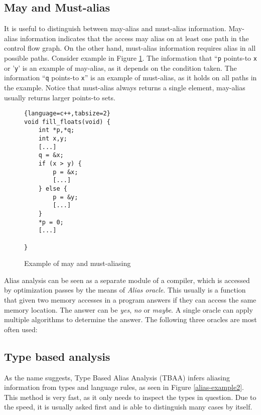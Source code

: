 \subsection{May and Must-alias}

It is useful to distinguish between may-alias and must-alias information.
May-alias information indicates that the access may alias on at least one path
in the control flow graph. On the other hand, must-alias information requires
alias in all possible paths. Consider example in Figure
\ref{alias-example-maymust}. The information that ``{\tt p} points-to {\tt x} or
'{\tt y}' is an example of may-alias, as it depends on the condition taken.
The information ``{\tt q} points-to {\tt x}'' is an example of must-alias, as it
holds on all paths in the example. Notice that must-alias always returns a
single element, may-alias usually returns larger points-to sets.

\begin{figure}[h!]
\begin{tcolorbox}
\begin{lstlisting}{language=c++,tabsize=2}
void fill_floats(void) {
	int *p,*q;
	int x,y;
	[...]
	q = &x;
	if (x > y) {
		p = &x;
		[...]
	} else {
		p = &y;
		[...]
	}
	*p = 0;
	[...]
	
}
\end{lstlisting}
\end{tcolorbox}
\caption{Example of may and must-aliasing}
\label{alias-example-maymust}
\end{figure}

Alias analysis can be seen as a separate module of a compiler, which is accessed
by optimization passes by the means of {\it Alias oracle}. This usually is a
function that given two memory accesses in a program answers if they can access
the same memory location. The answer can be {\it yes}, {\it no} or {\it maybe}.
A single oracle can apply multiple algorithms to determine the answer. The
following three oracles are most often used:

\subsection{Type based analysis}
\label{sec-tbaa}

As the name suggests, Type Based Alias Analysis (TBAA) infers aliasing
information from types and language rules, as seen in Figure
\ref{alias-example2}. This method is very fast, as it only needs to inspect
the types in question. Due to the speed, it is usually asked first and is able
to distinguish many cases by itself.

